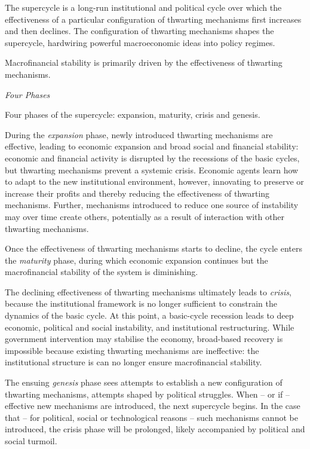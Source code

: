 \documentclass[
]{book}
\begin{document}
The supercycle is a long-run institutional and political cycle
over which the effectiveness of a particular configuration of thwarting mechanisms
first increases and then declines.
The configuration of thwarting mechanisms shapes the supercycle,
hardwiring powerful macroeconomic ideas into policy regimes.

Macrofinancial stability is primarily driven by the
effectiveness of thwarting mechanisms.

\emph{Four Phases}

Four phases of the supercycle: expansion, maturity, crisis and genesis.

During the \emph{expansion} phase, newly introduced thwarting
mechanisms are effective, leading to economic expansion and broad social and financial stability:
economic and financial activity is disrupted by the recessions of the basic cycles, but thwarting
mechanisms prevent a systemic crisis.
Economic agents learn how to adapt to the new institutional environment, however, innovating to
preserve or increase their profits and thereby reducing the effectiveness of thwarting mechanisms.
Further, mechanisms introduced to reduce one source of instability may over time create others,
potentially as a result of interaction with other thwarting mechanisms.

Once the effectiveness of thwarting mechanisms starts to decline, the cycle enters
the \emph{maturity} phase, during which economic expansion continues but
the macrofinancial stability of the system is diminishing.

The declining effectiveness of thwarting mechanisms ultimately leads to \emph{crisis},
because the institutional framework is no longer sufficient to
constrain the dynamics of the basic cycle.
At this point, a basic-cycle recession leads to deep economic, political and social instability,
and institutional restructuring.
While government intervention may stabilise the economy, broad-based recovery is impossible because
existing thwarting mechanisms are ineffective: the institutional structure is can no longer ensure
macrofinancial stability.

The ensuing \emph{genesis} phase sees attempts to establish a new configuration of
thwarting mechanisms, attempts shaped by political struggles.
When -- or if -- effective new mechanisms are introduced, the next supercycle begins.
In the case that -- for political, social or technological reasons --
such mechanisms cannot be introduced, the crisis phase will be prolonged,
likely accompanied by political and social turmoil.
\end{document}

